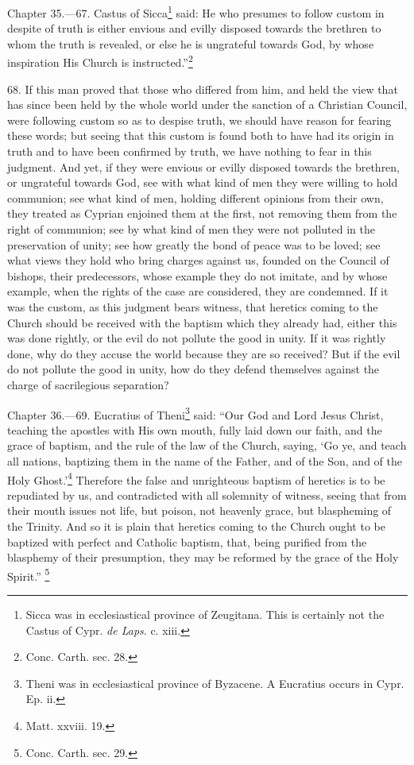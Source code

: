 
Chapter 35.—67. Castus of Sicca\footnote{\par  Sicca was in ecclesiastical province of Zeugitana. This is certainly not the Castus of Cypr. \emph{de Laps}. c. xiii.} said: He who presumes to follow custom in despite of truth is either envious and evilly disposed towards the brethren to whom the truth is revealed, or else he is ungrateful towards God, by whose inspiration His Church is instructed.''\footnote{\par  Conc. Carth. sec. 28.}

68. If this man proved that those who differed from him, and held the view that has since been held by the whole world under the sanction of a Christian Council, were following custom so as to despise truth, we should have reason for fearing these words; but seeing that this custom is found both to have had its origin in truth and to have been confirmed by truth, we have nothing to fear in this judgment. And yet, if they were envious or evilly disposed towards the brethren, or ungrateful towards God, see with what kind of men they were willing to hold communion; see what kind of men, holding different opinions from their own, they treated as Cyprian enjoined them at the first, not removing them from the right of communion; see by what kind of men they were not polluted in the preservation of unity; see how greatly the bond of peace was to be loved; see what views they hold who bring charges against us, founded on the Council of bishops, their predecessors, whose example they do not imitate, and by whose example, when the rights of the case are considered, they are condemned. If it was the custom, as this judgment bears witness, that heretics coming to the Church should be received with the baptism which they already had, either this was done rightly, or the evil do not pollute the good in unity. If it was rightly done, why do they accuse the world because they are so received? But if the evil do not pollute the good in unity, how do they defend themselves against the charge of sacrilegious separation?


Chapter 36.—69. Eucratius of Theni\footnote{\par  Theni was in ecclesiastical province of Byzacene. A Eucratius occurs in Cypr. Ep. ii.} said: ``Our God and Lord Jesus Christ, teaching the apostles with His own mouth, fully laid down our faith, and the grace of baptism, and the rule of the law of the Church, saying, ‘Go ye, and teach all nations, baptizing them in the name of the Father, and of the Son, and of the Holy Ghost.’\footnote{\par  Matt. xxviii. 19.} Therefore the false and unrighteous baptism of heretics is to be repudiated by us, and contradicted with all solemnity of witness, seeing that from their mouth issues not life, but poison, not heavenly grace, but blaspheming of the Trinity. And so it is plain that heretics coming to the Church ought to be baptized with perfect and Catholic baptism, that, being purified from the blasphemy of their presumption, they may be reformed by the grace of the Holy Spirit.'' \footnote{\par  Conc. Carth. sec. 29.}

